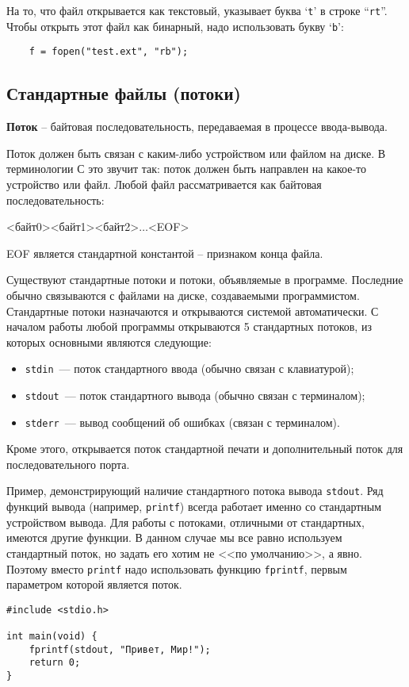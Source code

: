 На то, что файл открывается как текстовый, указывает буква `\verb|t|' в строке ``\verb|rt|''. Чтобы открыть этот файл как бинарный, надо использовать букву `\verb|b|':
\begin{verbatim}
    f = fopen("test.ext", "rb");
\end{verbatim}

\subsection{Стандартные файлы (потоки)}
\textbf{Поток} -- байтовая последовательность, передаваемая в процессе ввода-вывода.

Поток должен быть связан с каким-либо устройством или файлом на диске. В терминологии С это звучит так: поток должен быть направлен на какое-то устройство или файл. Любой 
файл рассматривается как байтовая последовательность:
\begin{center}
    <байт0><байт1><байт2>$\dots$<EOF>
\end{center}

EOF является стандартной константой -- признаком конца файла.

Существуют стандартные потоки и потоки, объявляемые в программе. Последние обычно связываются с файлами на диске, создаваемыми программистом. Стандартные потоки назначаются 
и открываются системой автоматически. С началом работы любой программы открываются 5 стандартных потоков, из которых основными являются следующие:
\begin{itemize}
    \item \verb|stdin|~--- поток стандартного ввода (обычно связан с клавиатурой);
    \item \verb|stdout|~--- поток стандартного вывода (обычно связан с терминалом);
    \item \verb|stderr|~--- вывод сообщений об ошибках (связан с терминалом).
\end{itemize}

Кроме этого, открывается поток стандартной печати и дополнительный поток для последовательного порта.

Пример, демонстрирующий наличие стандартного потока вывода \verb|stdout|. Ряд функций вывода (например, \verb|printf|) всегда работает именно со стандартным устройством вывода. Для работы с потоками, отличными от стандартных, имеются другие функции. В данном случае мы все равно используем стандартный поток, но задать его хотим не <<по умолчанию>>, а явно. Поэтому вместо \verb|printf| надо использовать функцию \verb|fprintf|, первым параметром которой является поток.
\begin{verbatim}
#include <stdio.h>

int main(void) {
    fprintf(stdout, "Привет, Мир!");
    return 0;
}
\end{verbatim}

